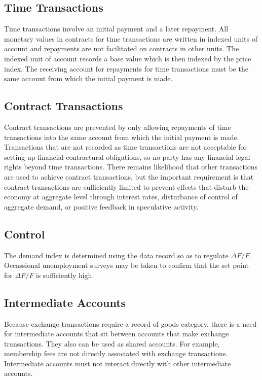 \subsection{Time Transactions}

Time transactions involve an initial payment and a later repayment. All monetary values in contracts
for time transactions are written in indexed units of account and repayments are not facilitated on
contracts in other units. The indexed unit of account records a base value which is then indexed by
the price index. The receiving account for repayments for time transactions must be the same account
from which the initial payment is made.

\subsection{Contract Transactions}

Contract transactions are prevented by only allowing repayments of time transactions into the same
account from which the initial payment is made. Transactions that are not recorded as time
transactions are not acceptable for setting up financial contractural obligations, so no party has
any financial legal rights beyond time transactions. There remains likelihood that other
transactions are used to achieve contract transactions, but the important requirement is that
contract transactions are sufficiently limited to prevent effects that disturb the economy at
aggregate level through interest rates, disturbance of control of aggregate demand, or positive
feedback in speculative activity. 

\subsection{Control}

The demand index is determined using the data record so as to regulate $\Delta F / F$. Occassional
unemployment surveys may be taken to confirm that the set point for $\Delta F / F$ is sufficiently
high.

\subsection{Intermediate Accounts}

Because exchange transactions require a record of goods category, there is a need for intermediate
accounts that sit between accounts that make exchange transactions. They also can be used as shared
accounts. For example, membership fees are not directly associated with exchange transactions.
Intermediate accounts must not interact directly with other intermediate accounts.

